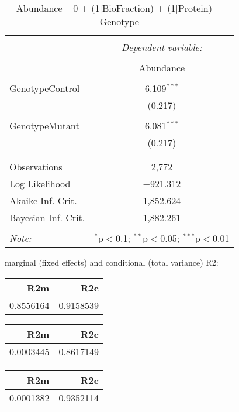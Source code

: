 \documentclass[11pt]{report}
\begin{document}
\begin{table}[!htbp] \centering 
  \caption{Abundance ~ 0 + (1|BioFraction) + (1|Protein) + Genotype} 
  \label{} 
\begin{tabular}{@{\extracolsep{5pt}}lc} 
\\[-1.8ex]\hline 
\hline \\[-1.8ex] 
 & \multicolumn{1}{c}{\textit{Dependent variable:}} \\ 
\cline{2-2} 
\\[-1.8ex] & Abundance \\ 
\hline \\[-1.8ex] 
 GenotypeControl & 6.109$^{***}$ \\ 
  & (0.217) \\ 
  & \\ 
 GenotypeMutant & 6.081$^{***}$ \\ 
  & (0.217) \\ 
  & \\ 
\hline \\[-1.8ex] 
Observations & 2,772 \\ 
Log Likelihood & $-$921.312 \\ 
Akaike Inf. Crit. & 1,852.624 \\ 
Bayesian Inf. Crit. & 1,882.261 \\ 
\hline 
\hline \\[-1.8ex] 
\textit{Note:}  & \multicolumn{1}{r}{$^{*}$p$<$0.1; $^{**}$p$<$0.05; $^{***}$p$<$0.01} \\ 
\end{tabular} 
\end{table} 
marginal (fixed effects) and conditional (total variance) R2:

\begin{tabular}{r|r}
\hline
R2m & R2c\\
\hline
0.8556164 & 0.9158539\\
\hline
\end{tabular}

\begin{tabular}{r|r}
\hline
R2m & R2c\\
\hline
0.0003445 & 0.8617149\\
\hline
\end{tabular}

\begin{tabular}{r|r}
\hline
R2m & R2c\\
\hline
0.0001382 & 0.9352114\\
\hline
\end{tabular}
\end{document}
